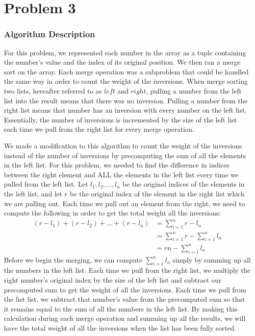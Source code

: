 \documentclass[letterpaper, 12pt]{math}
\begin{document}
\section*{Problem 3}

\subsubsection*{Algorithm Description}
For this problem, we represented each number in the array as a tuple containing
the number's value and the index of its original position. We then ran a merge
sort on the array. Each merge operation was a subproblem that could be handled
the same way in order to count the weight of the inversions. When merge sorting
two lists, hereafter referred to as \( left \) and \( right \), pulling a number
from the left list into the result means that there was no inversion. Pulling a
number from the right list means that number has an inversion with every number
on the left list. Essentially, the number of inversions is incremented by the
size of the left list each time we pull from the right list for every merge
operation. \par
We made a modification to this algorithm to count the weight of the inversions
instead of the number of inversions by precomputing the sum of all the elements
in the left list. For this problem, we needed to find the difference in indices
between the right element and ALL the elements in the left list every time we
pulled from the left list. Let \( l_1,l_2,\dots,l_n \) be the original indices
of the elements in the left list, and let \( r \) be the original index of the
element in the right list which we are pulling out. Each time we pull out an
element from the right, we need to compute the following in order to get the
total weight all the inversions:
\begin{align*}
  (r-l_1)+(r-l_2)+\dots+(r-l_n) &= \sum_{i=1}^{n}r-l_n \\
  &= \sum_{i=1}^{n}r-\sum_{i=1}^{n}l_n \\
  &= rn-\sum_{i=1}^{n}l_n
\end{align*}
Before we begin the merging, we can compute \( \sum_{i=1}^{n}l_n \) simply by
summing up all the numbers in the left list. Each time we pull from the right
list, we multiply the right number's original index by the size of the
left list and subtract our precomputed sum to get the weight of all the
inversions. Each time we pull from the list list, we subtract that number's
value from the precomputed sum so that it remains equal to the sum of all
the numbers in the left list. By making this calculation during each merge
operation and summing up all the results, we will have the total weight of
all the inversions when the list has been fully sorted.
\end{document}
